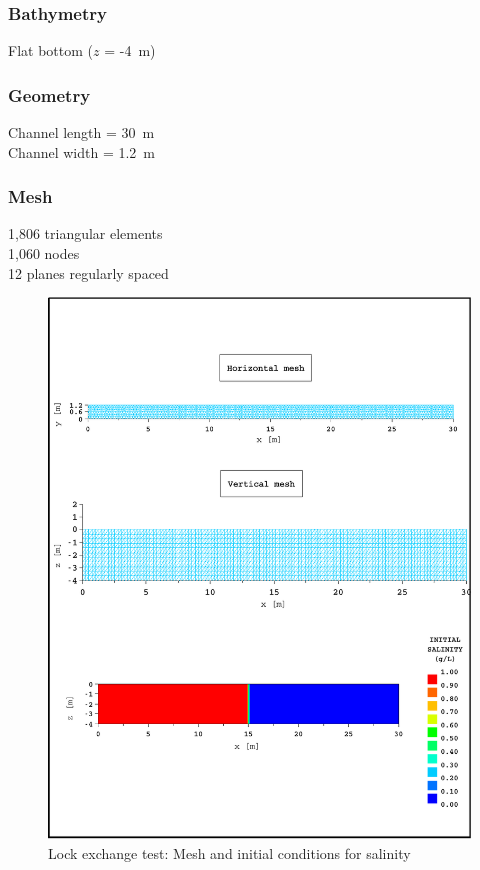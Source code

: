 \subsubsection{Bathymetry}
%
Flat bottom ($z$ = -4~m)
%
\subsubsection{Geometry}
%
Channel length = 30~m\\
Channel width = 1.2~m
%
\subsubsection{Mesh}
%
1,806 triangular elements\\
1,060 nodes\\
12 planes regularly spaced
%
\begin{figure} [H]
\centering
\includegraphics[scale=0.8]{../img/lock_exchange_mesh.pdf}
 \caption{Lock exchange test: Mesh and initial conditions for salinity}
 \label{t3d:lock-exchange:mesh_CI}
\end{figure}
%
%
%
